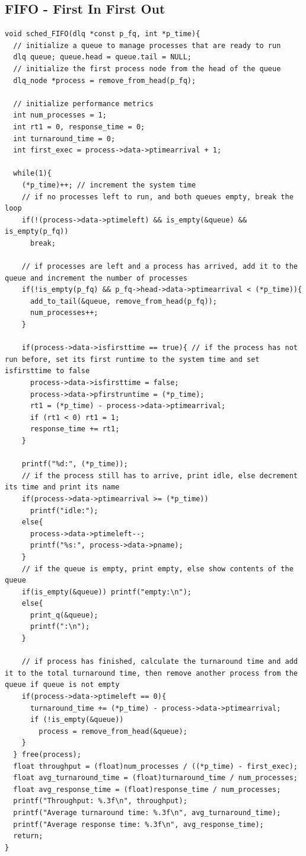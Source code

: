 \documentclass{article}
\theoremstyle{mytheoremstyle}
\theoremstyle{mytheoremstyle}
\theoremstyle{myproblemstyle}
\begin{document}
\subsection{FIFO - First In First Out}
\begin{lstlisting}[caption={FIFO Scheduling Algorithm},label={lst:fifo}]
void sched_FIFO(dlq *const p_fq, int *p_time){
  // initialize a queue to manage processes that are ready to run
  dlq queue; queue.head = queue.tail = NULL;
  // initialize the first process node from the head of the queue
  dlq_node *process = remove_from_head(p_fq);

  // initialize performance metrics
  int num_processes = 1;
  int rt1 = 0, response_time = 0;
  int turnaround_time = 0;
  int first_exec = process->data->ptimearrival + 1;

  while(1){
    (*p_time)++; // increment the system time
    // if no processes left to run, and both queues empty, break the loop
    if(!(process->data->ptimeleft) && is_empty(&queue) && is_empty(p_fq))
      break;
    
    // if processes are left and a process has arrived, add it to the queue and increment the number of processes
    if(!is_empty(p_fq) && p_fq->head->data->ptimearrival < (*p_time)){
      add_to_tail(&queue, remove_from_head(p_fq));
      num_processes++;
    }

    if(process->data->isfirsttime == true){ // if the process has not run before, set its first runtime to the system time and set isfirsttime to false
      process->data->isfirsttime = false;
      process->data->pfirstruntime = (*p_time);
      rt1 = (*p_time) - process->data->ptimearrival;
      if (rt1 < 0) rt1 = 1;
      response_time += rt1;
    }

    printf("%d:", (*p_time));
    // if the process still has to arrive, print idle, else decrement its time and print its name
    if(process->data->ptimearrival >= (*p_time))
      printf("idle:");
    else{
      process->data->ptimeleft--;
      printf("%s:", process->data->pname);
    }
    // if the queue is empty, print empty, else show contents of the queue
    if(is_empty(&queue)) printf("empty:\n");
    else{
      print_q(&queue);
      printf(":\n");
    }

    // if process has finished, calculate the turnaround time and add it to the total turnaround time, then remove another process from the queue if queue is not empty
    if(process->data->ptimeleft == 0){
      turnaround_time += (*p_time) - process->data->ptimearrival;
      if (!is_empty(&queue))
        process = remove_from_head(&queue);
    }
  } free(process);
  float throughput = (float)num_processes / ((*p_time) - first_exec);
  float avg_turnaround_time = (float)turnaround_time / num_processes;
  float avg_response_time = (float)response_time / num_processes;
  printf("Throughput: %.3f\n", throughput);
  printf("Average turnaround time: %.3f\n", avg_turnaround_time);
  printf("Average response time: %.3f\n", avg_response_time);
  return;
}
\end{lstlisting}
\end{document}
